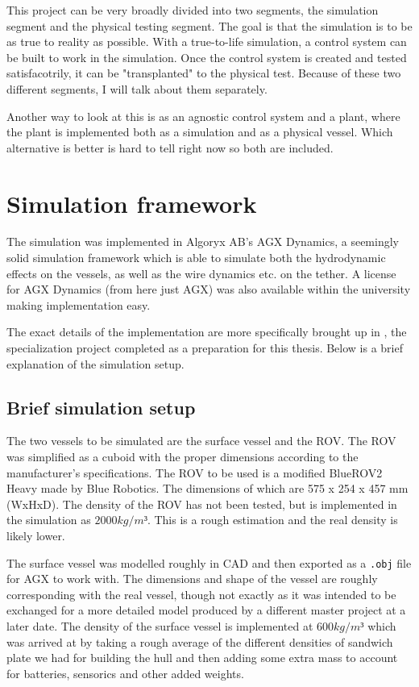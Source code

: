 \documentclass[class=article, crop=false]{standalone}
\begin{document}
This project can be very broadly divided into two segments, the simulation segment and the physical testing segment. The goal is that the simulation is to be as true to reality as possible. With a true-to-life simulation, a control system can be built to work in the simulation. Once the control system is created and tested satisfacotrily, it can be "transplanted" to the physical test. Because of these two different segments, I will talk about them separately.

Another way to look at this is as an agnostic control system and a plant, where the plant is implemented both as a simulation and as a physical vessel. Which alternative is better is hard to tell right now so both are included.
\section{Simulation framework}
The simulation was implemented in Algoryx AB's AGX Dynamics, a seemingly solid simulation framework which is able to simulate both the hydrodynamic effects on the vessels, as well as the wire dynamics etc. on the tether. A license for AGX Dynamics (from here just AGX) was also available within the university making implementation easy.

The exact details of the implementation are more specifically brought up in \citet{specialization}, the specialization project completed as a preparation for this thesis. Below is a brief explanation of the simulation setup.

\subsection{Brief simulation setup}
The two vessels to be simulated are the surface vessel and the ROV. The ROV was simplified as a cuboid with the proper dimensions according to the manufacturer's specifications. The ROV to be used is a modified BlueROV2 Heavy made by Blue Robotics. The dimensions of which are 575 x 254 x 457 mm (WxHxD). The density of the ROV has not been tested, but is implemented in the simulation as \(2000kg/m³\). This is a rough estimation and the real density is likely lower.

The surface vessel was modelled roughly in CAD and then exported as a \texttt{.obj} file for AGX to work with. The dimensions and shape of the vessel are roughly corresponding with the real vessel, though not exactly as it was intended to be exchanged for a more detailed model produced by a different master project at a later date. The density of the surface vessel is implemented at \(600kg/m³\) which was arrived at by taking a rough average of the different densities of sandwich plate we had for building the hull and then adding some extra mass to account for batteries, sensorics and other added weights.
\end{document}
